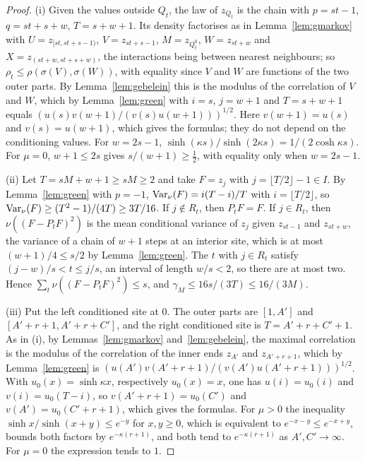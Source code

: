\begin{proof}
(i) Given the values outside $Q_t$, the law of $z_{Q_t}$ is the chain with
$p=st-1$, $q=st+s+w$, $T=s+w+1$. Its density factorises as in
Lemma~\ref{lem:gmarkov} with $U=z_{[st,st+s-1)}$, $V=z_{st+s-1}$,
$M=z_{Q^0_t}$, $W=z_{st+w}$ and $X=z_{(st+w,st+s+w)}$, the interactions being
between nearest neighbours; so $\rho_t\le\rho(\sigma(V),\sigma(W))$, with
equality since $V$ and $W$ are functions of the two outer parts. By
Lemma~\ref{lem:gebelein} this is the modulus of the correlation of $V$ and $W$,
which by Lemma~\ref{lem:green} with $i=s$, $j=w+1$ and $T=s+w+1$ equals
$(u(s)v(w+1)/(v(s)u(w+1)))^{1/2}$. Here $v(w+1)=u(s)$ and $v(s)=u(w+1)$, which
gives the formulas; they do not depend on the conditioning values. For $w=2s-1$,
$\sinh(\kappa s)/\sinh(2\kappa s)=1/(2\cosh\kappa s)$. For $\mu=0$, $w+1\le2s$
gives $s/(w+1)\ge\frac12$, with equality only when $w=2s-1$.

(ii) Let $T=sM+w+1\ge sM\ge2$ and take $F=z_j$ with $j=\lfloor T/2\rfloor-1\in
I$. By Lemma~\ref{lem:green} with $p=-1$, $\operatorname{Var}_\nu(F)=i(T-i)/T$ with $i=
\lfloor T/2\rfloor$, so $\operatorname{Var}_\nu(F)\ge(T^2-1)/(4T)\ge3T/16$. If $j\notin R_t$,
then $P_tF=F$. If $j\in R_t$, then $\nu((F-P_tF)^2)$ is the mean conditional
variance of $z_j$ given $z_{st-1}$ and $z_{st+w}$, the variance of a chain of
$w+1$ steps at an interior site, which is at most $(w+1)/4\le s/2$ by
Lemma~\ref{lem:green}. The $t$ with $j\in R_t$ satisfy $(j-w)/s<t\le j/s$, an
interval of length $w/s<2$, so there are at most two. Hence $\sum_t\nu((F-P_t
F)^2)\le s$, and $\gamma_M\le16s/(3T)\le16/(3M)$.

(iii) Put the left conditioned site at $0$. The outer parts are $[1,A']$ and
$[A'+r+1,A'+r+C']$, and the right conditioned site is $T=A'+r+C'+1$. As in (i),
by Lemmas~\ref{lem:gmarkov} and~\ref{lem:gebelein}, the maximal correlation is
the modulus of the correlation of the inner ends $z_{A'}$ and $z_{A'+r+1}$,
which by Lemma~\ref{lem:green} is $(u(A')v(A'+r+1)/(v(A')u(A'+r+1)))^{1/2}$.
With $u_0(x)=\sinh\kappa x$, respectively $u_0(x)=x$, one has $u(i)=u_0(i)$ and
$v(i)=u_0(T-i)$, so $v(A'+r+1)=u_0(C')$ and $v(A')=u_0(C'+r+1)$, which gives the
formulas. For $\mu>0$ the inequality $\sinh x/\sinh(x+y)\le e^{-y}$ for $x,y\ge
0$, which is equivalent to $e^{-x-y}\le e^{-x+y}$, bounds both factors by
$e^{-\kappa(r+1)}$, and both tend to $e^{-\kappa(r+1)}$ as $A',C'\to\infty$.
For $\mu=0$ the expression tends to $1$.
\end{proof}

